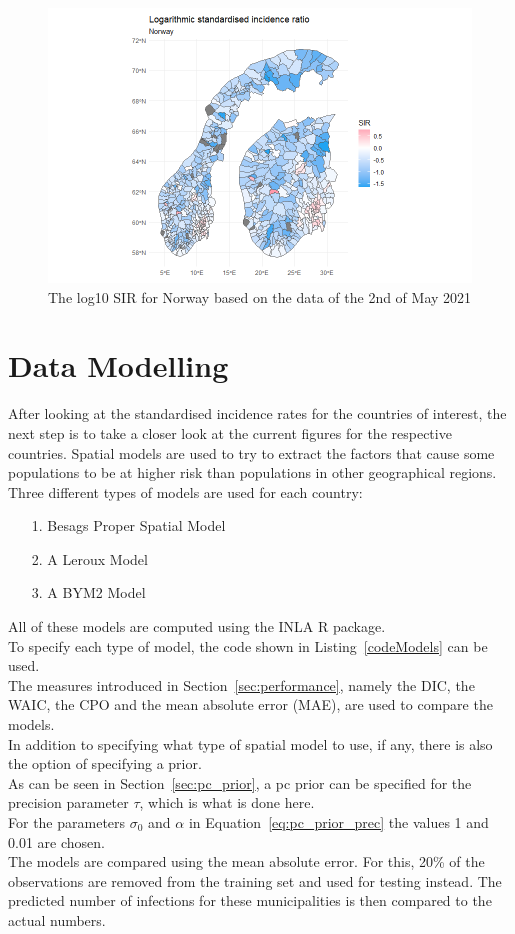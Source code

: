 \begin{figure}[H]
 \centering
 \includegraphics[width = 1.2\textwidth]{sir_norway_log.png}
 \caption{The log10 SIR for Norway based on the data of the 2nd of May 2021}
 \label{sirnorwaylog}
\end{figure}
\clearpage
\section{Data Modelling}
After looking at the standardised incidence rates for the countries of interest, the next step is to take a closer look at the current figures for the respective countries. Spatial models are used to try to extract the factors that cause some populations to be at higher risk than populations in other geographical regions. Three different types of models are used for each country:
\begin{itemize}
  \item[1.] Besags Proper Spatial Model
  \item[2.] A Leroux Model
  \item[3.] A BYM2 Model
\end{itemize}
All of these models are computed using the INLA \autocite[][]{rinla} R package. \\
To specify each type of model, the code shown in Listing~\ref{codeModels} can be used. \\
The measures introduced in Section~\ref{sec:performance}, namely the DIC, the WAIC, the CPO and the mean absolute error (MAE), are used to compare the models.\\
In addition to specifying what type of spatial model to use, if any, there is also the option of specifying a prior. \\
As can be seen in Section~\ref{sec:pc_prior}, a pc prior can be specified for the precision parameter $\tau$, which is what is done here. \\
For the parameters $\sigma_0$ and $\alpha$ in Equation~\ref{eq:pc_prior_prec} the values 1 and 0.01 are chosen. \\
The models are compared using the mean absolute error. For this, 20\% of the observations are removed from the training set and used for testing instead. The predicted number of infections for these municipalities is then compared to the actual numbers.
